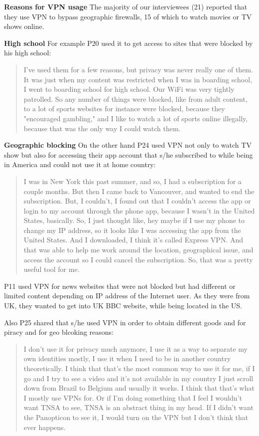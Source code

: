 \textbf{Reasons for VPN usage} The majority of our interviewees (21) reported
that they use VPN to bypass geographic firewalls, 15 of which to watch movies
or TV shows online.  

\textbf{High school} For example P20 used it to get access to sites that were
blocked by his high school: 
\begin{quote}I've used them for a few reasons,
    but privacy was never really one of them. It was just when my content was
    restricted when I was in boarding school, I went to boarding
    school for high school. Our WiFi was very tightly patrolled. So any number
    of things were blocked, like from adult content, to a lot of sports
    websites for instance were blocked, because they "encouraged gambling,"
    and I like to watch a lot of sports online illegally, because that was the
    only way I could watch them.\end{quote}

\textbf{Geographic blocking} On the other hand P24 used VPN not only to watch
TV show but also for accessing their app account that s/he subscribed to while
being in America and could not use it at home country: \begin{quote}I was in
New York this past summer, and so, I had a subscription for a couple months.
But then I came back to Vancouver, and wanted to end the subscription. But, I
couldn't, I found out that I couldn't access the app or login to my account
through the phone app, because I wasn't in the United States, basically. So, I
just thought like, hey maybe if I use my phone to change my IP address, so it
looks like I was accessing the app from the United States. And I downloaded, I
think it's called Express VPN. And that was able to help me work around the
location, geographical issue, and access the account so I could cancel the
subscription. So, that was a pretty useful tool for me.\end{quote}


P11 used VPN for news websites that were not blocked but had different or
limited content depending on IP address of the Internet user. As they were
from UK, they wanted to get into UK BBC website, while being located in the
US.

Also P25 shared that s/he used VPN in order to obtain different goods and for
piracy and for geo blcoking reasons: \begin{quote}I don't use it for privacy
much anymore, I use it as a way to separate my own identities mostly, I use it
when I need to be in another country theoretically. I think that that's the
most common way to use it for me, if I go and I try to see a video and it's
not available in my country I just scroll down from Brazil to Belgium and
usually it works. I think that that's what I mostly use VPNs for. Or if I'm
doing something that I feel I wouldn't want TNSA to see, TNSA is an abstract
thing in my head. If I didn't want the Panopticon to see it, I would turn on
the VPN but I don't think that ever happens.\end{quote}

